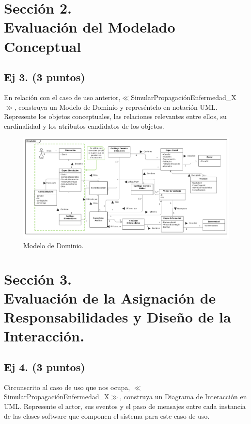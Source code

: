 \documentclass[a4paper]{article}
\begin{document}
\section{Sección 2.\\Evaluación del Modelado Conceptual}
\subsection{Ej 3. (3 puntos)}

En relación con el  caso de uso anterior,$\ll$SimularPropagaciónEnfermedad\_X $\gg$, construya un Modelo de Dominio y represéntelo en notación UML. Represente los objetos conceptuales,  las  relaciones relevantes entre ellos, su cardinalidad y los atributos candidatos de los objetos.\\

\begin{figure}[H]
	\centering
	\includegraphics[width=1\linewidth]{graphics/3-MD.pdf}
	\caption{Modelo de Dominio.}
\end{figure}


\section{Sección 3.\\Evaluación de la Asignación de Responsabilidades y Diseño de la Interacción.}
\subsection{Ej 4. (3 puntos)}
Circunscrito al caso de uso  que nos ocupa, $\ll$SimularPropagaciónEnfermedad\_X$\gg$, construya un Diagrama de Interacción en UML. Represente el actor, sus eventos y el paso de mensajes entre cada instancia de las clases software que componen el sistema para este caso de uso.
\end{document}
